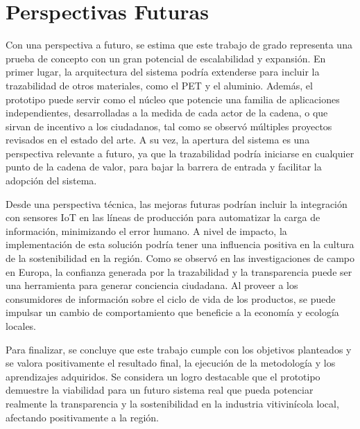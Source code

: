 \section{Perspectivas Futuras}

Con una perspectiva a futuro, se estima que este trabajo de grado representa una prueba de concepto con un gran potencial de escalabilidad y expansión. En primer lugar, la arquitectura del sistema podría extenderse para incluir la trazabilidad de otros materiales, como el PET y el aluminio. Además, el prototipo puede servir como el núcleo que potencie una familia de aplicaciones independientes, desarrolladas a la medida de cada actor de la cadena, o que sirvan de incentivo a los ciudadanos, tal como se observó múltiples proyectos revisados en el estado del arte. A su vez, la apertura del sistema es una perspectiva relevante a futuro, ya que la trazabilidad podría iniciarse en cualquier punto de la cadena de valor, para bajar la barrera de entrada y facilitar la adopción del sistema.

Desde una perspectiva técnica, las mejoras futuras podrían incluir la integración con sensores IoT en las líneas de producción para automatizar la carga de información, minimizando el error humano. A nivel de impacto, la implementación de esta solución podría tener una influencia positiva en la cultura de la sostenibilidad en la región. Como se observó en las investigaciones de campo en Europa, la confianza generada por la trazabilidad y la transparencia puede ser una herramienta para generar conciencia ciudadana. Al proveer a los consumidores de información sobre el ciclo de vida de los productos, se puede impulsar un cambio de comportamiento que beneficie a la economía y ecología locales.

Para finalizar, se concluye que este trabajo cumple con los objetivos planteados y se valora positivamente el resultado final, la ejecución de la metodología y los aprendizajes adquiridos. Se considera un logro destacable que el prototipo demuestre la viabilidad para un futuro sistema real que pueda potenciar realmente la transparencia y la sostenibilidad en la industria vitivinícola local, afectando positivamente a la región.
